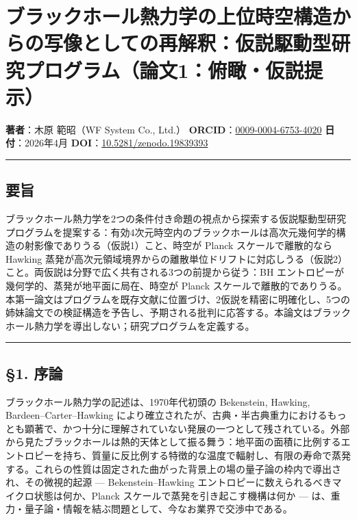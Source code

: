 \documentclass[a4paper,11pt]{ltjsarticle}
\theoremstyle{definition}
\begin{document}
\section{ブラックホール熱力学の上位時空構造からの写像としての再解釈：仮説駆動型研究プログラム（論文1：俯瞰・仮説提示）}\label{ux30d6ux30e9ux30c3ux30afux30dbux30fcux30ebux71b1ux529bux5b66ux306eux4e0aux4f4dux6642ux7a7aux69cbux9020ux304bux3089ux306eux5199ux50cfux3068ux3057ux3066ux306eux518dux89e3ux91c8ux4eeeux8aacux99c6ux52d5ux578bux7814ux7a76ux30d7ux30edux30b0ux30e9ux30e0ux8ad6ux65871ux4fefux77b0ux4eeeux8aacux63d0ux793a}

\textbf{著者}：木原 範昭（WF System Co., Ltd.）
\textbf{ORCID}：\href{https://orcid.org/0009-0004-6753-4020}{0009-0004-6753-4020}
\textbf{日付}：2026年4月
\textbf{DOI}：\href{https://doi.org/10.5281/zenodo.19839393}{10.5281/zenodo.19839393}

\begin{center}\rule{0.5\linewidth}{0.5pt}\end{center}

\subsection{要旨}\label{ux8981ux65e8}

ブラックホール熱力学を2つの条件付き命題の視点から探索する仮説駆動型研究プログラムを提案する：有効4次元時空内のブラックホールは高次元幾何学的構造の射影像でありうる（仮説1）こと、時空が
Planck スケールで離散的なら Hawking
蒸発が高次元領域境界からの離散単位ドリフトに対応しうる（仮説2）こと。両仮説は分野で広く共有される3つの前提から従う：BH
エントロピーが幾何学的、蒸発が地平面に局在、時空が Planck
スケールで離散的でありうる。本第一論文はプログラムを既存文献に位置づけ、2仮説を精密に明確化し、5つの姉妹論文での検証構造を予告し、予期される批判に応答する。本論文はブラックホール熱力学を導出しない；研究プログラムを定義する。

\begin{center}\rule{0.5\linewidth}{0.5pt}\end{center}

\subsection{§1. 序論}\label{ux5e8fux8ad6}

ブラックホール熱力学の記述は、1970年代初頭の Bekenstein, Hawking,
Bardeen--Carter--Hawking
により確立されたが、古典・半古典重力におけるもっとも顕著で、かつ十分に理解されていない発展の一つとして残されている。外部から見たブラックホールは熱的天体として振る舞う：地平面の面積に比例するエントロピーを持ち、質量に反比例する特徴的な温度で輻射し、有限の寿命で蒸発する。これらの性質は固定された曲がった背景上の場の量子論の枠内で導出され、その微視的起源
--- Bekenstein--Hawking
エントロピーに数えられるべきマイクロ状態は何か、Planck
スケールで蒸発を引き起こす機構は何か ---
は、重力・量子論・情報を結ぶ問題として、今なお業界で交渉中である。
\end{document}
